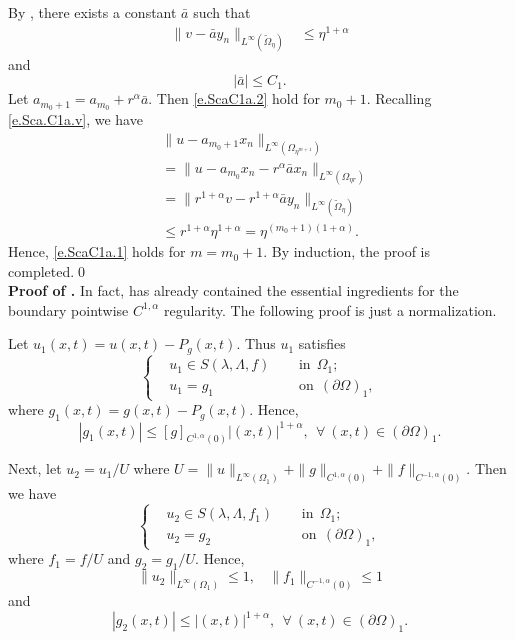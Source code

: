 \documentclass[preprint,12pt]{elsarticle}
\theoremstyle{definition}
\theoremstyle{remark}
\numberwithin{equation}{section}
\begin{document}
By , there exists a constant $\bar{a}$ such that
\begin{equation*}
\begin{aligned}
    \|v-\bar{a}y_n\|_{L^{\infty }(\tilde{\Omega} _{\eta})}&\leq \eta ^{1+\alpha}
\end{aligned}
\end{equation*}
and
\begin{equation*}
|\bar{a}|\leq C_1.
\end{equation*}
Let $a_{m_0+1}=a_{m_0}+r^{\alpha}\bar{a}$. Then \cref{e.ScaC1a.2} hold for $m_0+1$. Recalling \cref{e.Sca.C1a.v}, we have
\begin{equation*}
  \begin{aligned}
&\|u-a_{m_0+1}x_n\|_{L^{\infty}(\Omega_{\eta^{m+1}})}\\
&= \|u-a_{m_0}x_n-r^{\alpha}\bar{a}x_n\|_{L^{\infty}(\Omega_{\eta r})}\\
&= \|r^{1+\alpha}v-r^{1+\alpha}\bar{a}y_n\|_{L^{\infty}(\tilde{\Omega}_{\eta})}\\
&\leq r^{1+\alpha}\eta^{1+\alpha}=\eta^{(m_0+1)(1+\alpha)}.
  \end{aligned}
\end{equation*}
Hence, \cref{e.ScaC1a.1} holds for $m=m_0+1$. By induction, the proof is completed.\qed
~\\

\noindent\textbf{Proof of .} In fact,  has already contained the essential ingredients for the boundary pointwise $C^{1,\alpha}$ regularity. The following proof is just a normalization.

Let $u_1(x,t)=u(x,t)-P_g(x,t)$. Thus $u_1$ satisfies
\begin{equation*}
\left\{\begin{aligned}
&u_1\in S(\lambda,\Lambda,f)&& ~~\mbox{in}~~\Omega_1;\\
&u_1=g_1&& ~~\mbox{on}~~(\partial \Omega)_1,
\end{aligned}\right.
\end{equation*}
where $g_1(x,t)=g(x,t)-P_g(x,t)$. Hence,
\begin{equation*}
  |g_1(x,t)|\leq [g]_{C^{1,\alpha}(0)}|(x,t)|^{1+\alpha}, ~~\forall ~(x,t)\in (\partial \Omega)_1.
\end{equation*}

Next, let $u_2=u_1/U$ where $U=\|u\|_{L^{\infty}(\Omega_1)}+\|g\|_{C^{1,\alpha}(0)}
+\|f\|_{C^{-1,\alpha}(0)}$. Then we have
\begin{equation*}
\left\{\begin{aligned}
&u_2\in S(\lambda,\Lambda,f_1)&& ~~\mbox{in}~~\Omega_1;\\
&u_2=g_2&& ~~\mbox{on}~~(\partial \Omega)_1,
\end{aligned}\right.
\end{equation*}
where $f_1=f/U$ and $g_2=g_1/U$. Hence,
\begin{equation*}
  \|u_2\|_{L^{\infty}(\Omega_1)}\leq 1,~~~~\|f_1\|_{C^{-1,\alpha}(0)}\leq 1
\end{equation*}
and
\begin{equation*}
  |g_2(x,t)|\leq  |(x,t)|^{1+\alpha}, ~~\forall ~(x,t)\in (\partial \Omega)_1.
\end{equation*}
\end{document}
